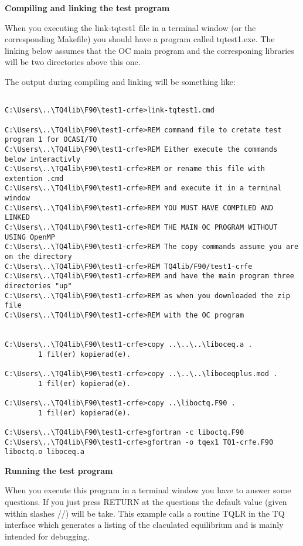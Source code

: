 \documentclass[12pt]{article}
\begin{document}
\newpage

{\bf Compiling and linking the test program}

\bigskip

When you executing the link-tqtest1 file in a terminal window (or the
corresponding Makefile) you should have a program called tqtest1.exe.
The linking below assumes that the OC main program and the corresponing
libraries will be two directories above this one.

The output during compiling and linking will be something like:

{\small
\begin{verbatim}

C:\Users\..\TQ4lib\F90\test1-crfe>link-tqtest1.cmd

C:\Users\..\TQ4lib\F90\test1-crfe>REM command file to cretate test program 1 for OCASI/TQ
C:\Users\..\TQ4lib\F90\test1-crfe>REM Either execute the commands below interactivly
C:\Users\..\TQ4lib\F90\test1-crfe>REM or rename this file with extention .cmd
C:\Users\..\TQ4lib\F90\test1-crfe>REM and execute it in a terminal window
C:\Users\..\TQ4lib\F90\test1-crfe>REM YOU MUST HAVE COMPILED AND LINKED
C:\Users\..\TQ4lib\F90\test1-crfe>REM THE MAIN OC PROGRAM WITHOUT USING OpenMP
C:\Users\..\TQ4lib\F90\test1-crfe>REM The copy commands assume you are on the directory
C:\Users\..\TQ4lib\F90\test1-crfe>REM TQ4lib/F90/test1-crfe
C:\Users\..\TQ4lib\F90\test1-crfe>REM and have the main program three directories "up"
C:\Users\..\TQ4lib\F90\test1-crfe>REM as when you downloaded the zip file
C:\Users\..\TQ4lib\F90\test1-crfe>REM with the OC program


C:\Users\..\TQ4lib\F90\test1-crfe>copy ..\..\..\liboceq.a .
        1 fil(er) kopierad(e).

C:\Users\..\TQ4lib\F90\test1-crfe>copy ..\..\..\liboceqplus.mod .
        1 fil(er) kopierad(e).

C:\Users\..\TQ4lib\F90\test1-crfe>copy ..\liboctq.F90 .
        1 fil(er) kopierad(e).

C:\Users\..\TQ4lib\F90\test1-crfe>gfortran -c liboctq.F90
C:\Users\..\TQ4lib\F90\test1-crfe>gfortran -o tqex1 TQ1-crfe.F90 liboctq.o liboceq.a
\end{verbatim}
}

\newpage

\bigskip

{\bf Running the test program}

\bigskip

When you execute this program in a terminal window you have to answer
some questions.  If you just press RETURN at the questions the default
value (given within slashes //) will be take.  This example calls a
routine TQLR in the TQ interface which generates a listing of the
claculated equilibrium and is mainly intended for debugging.
\end{document}
